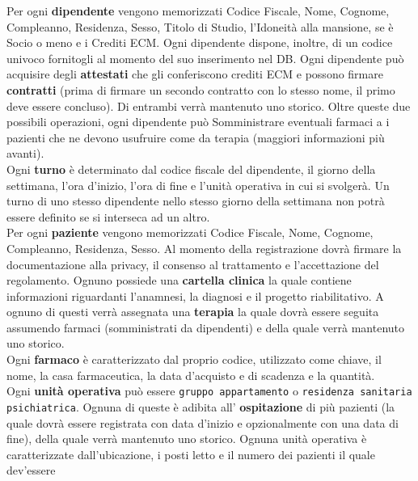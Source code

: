 \documentclass[a4paper, 12pt]{report}
\newenvironment{changemargin}[2]{%
  \begin{list}{}{%
    \setlength{\topsep}{0pt}%
    \setlength{\leftmargin}{#1}%
    \setlength{\rightmargin}{#2}%
    \setlength{\listparindent}{\parindent}%
    \setlength{\itemindent}{\parindent}%
    \setlength{\parsep}{\parskip}%
  }%
  \item[]}{\end{list}}
\begin{document}
\begin{changemargin}{0.5cm}{0.5cm}
        \noindent
        Per ogni \textbf{dipendente} vengono memorizzati Codice Fiscale, Nome, Cognome, Compleanno, Residenza, Sesso, Titolo di Studio,
        l'Idoneità alla mansione, se è Socio o meno e i Crediti ECM. Ogni dipendente dispone, inoltre, di un codice univoco fornitogli
        al momento del suo inserimento nel DB. 
        Ogni dipendente può acquisire degli \textbf{attestati} che gli conferiscono crediti ECM e possono firmare
        \textbf{contratti} (prima di firmare un secondo contratto con lo stesso nome, il primo deve essere concluso).
        Di entrambi verrà mantenuto uno storico. Oltre queste due possibili operazioni, ogni dipendente può Somministrare
        eventuali farmaci a i pazienti che ne devono usufruire come da terapia (maggiori informazioni più avanti).\\
        Ogni \textbf{turno} è determinato dal codice fiscale del dipendente, il giorno della settimana, 
        l'ora d'inizio, l'ora di fine e l'unità operativa in cui si svolgerà. Un turno di uno stesso dipendente nello stesso
        giorno della settimana non potrà essere definito se si interseca ad un altro.\\
        Per ogni \textbf{paziente} vengono memorizzati Codice Fiscale, Nome, Cognome, Compleanno, Residenza, Sesso.
        Al momento della registrazione dovrà firmare la documentazione alla privacy, il consenso al trattamento e l'accettazione
        del regolamento. Ognuno possiede una \textbf{cartella clinica} la quale contiene informazioni riguardanti
        l'anamnesi, la diagnosi e il progetto riabilitativo. A ognuno di questi verrà assegnata una 
        \textbf{terapia} la quale dovrà essere seguita assumendo farmaci (somministrati da dipendenti) e della quale
        verrà mantenuto uno storico.\\
        Ogni \textbf{farmaco} è caratterizzato dal proprio codice, utilizzato come chiave, il nome, la casa farmaceutica, 
        la data d'acquisto e di scadenza e la quantità.\\
        Ogni \textbf{unità operativa} può essere \texttt{gruppo appartamento} o \texttt{residenza sanitaria psichiatrica}.
        Ognuna di queste è adibita all' \textbf{ospitazione} di più pazienti (la quale dovrà essere registrata
        con data d'inizio e opzionalmente con una data di fine), della quale verrà mantenuto uno storico.
        Ognuna unità operativa è caratterizzate dall'ubicazione, i posti letto e il numero dei pazienti il quale dev'essere

\end{changemargin}
\end{document}
